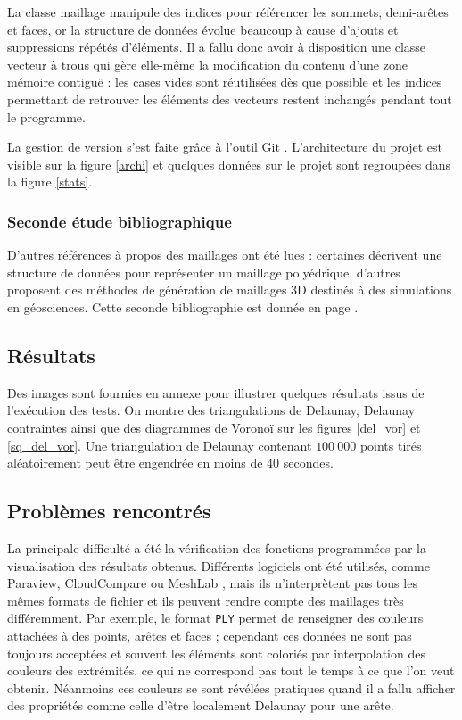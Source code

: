 \documentclass[12pt,a4paper]{report}
\begin{document}
La classe maillage manipule des indices pour référencer les sommets, demi-arêtes et faces, or la structure de données évolue beaucoup à cause d'ajouts et suppressions répétés d'éléments. Il a fallu donc avoir à disposition une classe \og vecteur à trous \fg{} qui gère elle-même la modification du contenu d'une zone mémoire contiguë : les cases vides sont réutilisées dès que possible et les indices permettant de retrouver les éléments des vecteurs restent inchangés pendant tout le programme.

\vspace{1cm}
La gestion de version s'est faite grâce à l'outil Git \cite{Git}.
L'architecture du projet est visible sur la figure \ref{archi} et quelques données sur le projet sont regroupées dans la figure \ref{stats}.

\subsubsection{Seconde étude bibliographique}

D'autres références à propos des maillages ont été lues : certaines décrivent une structure de données pour représenter un maillage polyédrique, d'autres proposent des méthodes de génération de maillages 3D destinés à des simulations en géosciences. Cette seconde bibliographie est donnée en page \pageref{second_biblio}.

\subsection{Résultats}

Des images sont fournies en annexe pour illustrer quelques résultats issus de l'exécution des tests. On montre des triangulations de Delaunay, Delaunay contraintes ainsi que des diagrammes de Voronoï sur les figures \ref{del_vor} et \ref{sq_del_vor}. Une triangulation de Delaunay contenant $100\ 000$ points tirés aléatoirement peut être engendrée en moins de $40$ secondes.

\subsection{Problèmes rencontrés}

La principale difficulté a été la vérification des fonctions programmées par la visualisation des résultats obtenus. Différents logiciels ont été utilisés, comme Paraview, CloudCompare ou MeshLab \cite{Paraview, CloudCompare, MeshLab}, mais ils n'interprètent pas tous les mêmes formats de fichier et ils peuvent rendre compte des maillages très différemment. Par exemple, le format \verb+PLY+ permet de renseigner des couleurs attachées à des points, arêtes et faces ; cependant ces données ne sont pas toujours acceptées et souvent les éléments sont coloriés par interpolation des couleurs des extrémités, ce qui ne correspond pas tout le temps à ce que l'on veut obtenir. Néanmoins ces couleurs se sont révélées pratiques quand il a fallu afficher des propriétés comme celle d'être localement Delaunay pour une arête.
\end{document}
